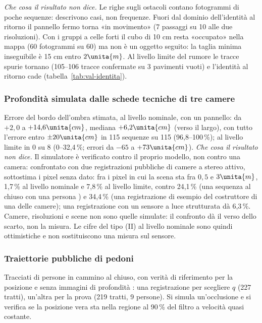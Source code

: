 \emph{Che cosa il risultato non dice.} Le righe sugli ostacoli contano fotogrammi di poche sequenze: descrivono casi, non frequenze. Fuori dal dominio dell'identità al ritorno il pannello fermo torna «in movimento» (7 passaggi su 10 alle due risoluzioni). Con i gruppi a celle forti il cubo di 10 cm resta «occupato» nella mappa (60 fotogrammi su 60) ma non è un oggetto seguito: la taglia minima inseguibile è 15 cm entro $2\unita{m}$. Al livello limite del rumore le tracce spurie tornano (105–106 tracce confermate su 3 pavimenti vuoti) e l'identità al ritorno cade (tabella~\ref{tab:val-identita}).

\subsubsection*{Profondità simulata dalle schede tecniche di tre camere}

Errore del bordo dell'ombra stimata, al livello nominale, con un pannello: da $+2{,}0$ a $+14{,}6\unita{cm}$, mediana $+6{,}2\unita{cm}$ (verso il largo), con tutto l'errore entro $\pm20\unita{cm}$ in 115 sequenze su 115 (96,8–100\,\%); al livello limite in 0 su 8 (0–32,4\,\%; errori da $-65$ a $+73\unita{cm}$).  \emph{Che cosa il risultato non dice.} Il simulatore è verificato contro il proprio modello, non contro una camera: confrontato con due registrazioni pubbliche di camere a stereo attivo, sottostima i pixel senza dato: fra i pixel in cui la scena sta fra $0{,}5$ e $3\unita{m}$, 1,7\,\% al livello nominale e 7,8\,\% al livello limite, contro 24,1\,\% (una sequenza al chiuso con una persona \cite{depthtrack}) e 34,4\,\% (una registrazione di esempio del costruttore di una delle camere); una registrazione con un sensore a luce strutturata \cite{tum-rgbd} dà 6,3\,\%. Camere, risoluzioni e scene non sono quelle simulate: il confronto dà il verso dello scarto, non la misura. Le cifre del tipo (II) al livello nominale sono quindi ottimistiche e non sostituiscono una misura sul sensore.

\subsubsection*{Traiettorie pubbliche di pedoni}

Tracciati di persone in cammino al chiuso, con verità di riferimento per la posizione e senza immagini di profondità \cite{thor}: una registrazione per scegliere $q$ (227 tratti), un'altra per la prova (219 tratti, 9 persone). Si simula un'occlusione e si verifica se la posizione vera sta nella regione al 90\,\% del filtro a velocità quasi costante.

